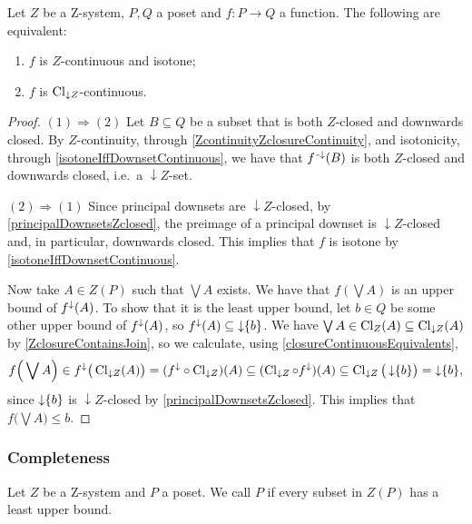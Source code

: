 \begin{proposition} \label{isotoneZcontinuousFunction}
Let $Z$ be a $\mathrm{Z}$-system, $P,Q$ a poset and $f: P\to Q$ a function. The following are equivalent:
\begin{enumerate}
\item $f$ is $Z$-continuous and isotone;
\item $f$ is $\operatorname{Cl}_{\downarrow Z}$-continuous.
\end{enumerate}
\end{proposition}
\begin{proof}
$(1) \Rightarrow (2)$ Let $B\subseteq Q$ be a subset that is both $Z$-closed and downwards closed. By $Z$-continuity, through \ref{ZcontinuityZclosureContinuity}, and isotonicity, through \ref{isotoneIffDownsetContinuous}, we have that $f^{\text{\hspace{0.15em}-}\downarrow}(B)$ is both $Z$-closed and downwards closed, i.e.\ a ${\downarrow Z}$-set.

$(2) \Rightarrow (1)$ Since principal downsets are ${\downarrow}Z$-closed, by \ref{principalDownsetsZclosed}, the preimage of a principal downset is ${\downarrow}Z$-closed and, in particular, downwards closed. This implies that $f$ is isotone by \ref{isotoneIffDownsetContinuous}.

Now take $A\in Z(P)$ such that $\bigvee A$ exists. We have that $f(\bigvee A)$ is an upper bound of $f^\downarrow(A)$. To show that it is the least upper bound, let $b\in Q$ be some other upper bound of $f^\downarrow(A)$, so $f^\downarrow(A) \subseteq \operatorname{\downarrow}\{b\}$.
We have $\bigvee A \in \operatorname{Cl}_Z(A) \subseteq \operatorname{Cl}_{\downarrow Z}(A)$ by \ref{ZclosureContainsJoin}, so we calculate, using \ref{closureContinuousEquivalents},
\[ f\Big(\bigvee A\Big) \in f^\downarrow\big(\operatorname{Cl}_{\downarrow Z}(A)\big) = (f^\downarrow\circ \operatorname{Cl}_{\downarrow Z})(A) \subseteq (\operatorname{Cl}_{\downarrow Z}\circ f^\downarrow)(A)\subseteq \operatorname{Cl}_{\downarrow Z}\big(\operatorname{\downarrow}\{b\}\big) = \operatorname{\downarrow}\{b\}, \]
since $\operatorname{\downarrow}\{b\}$ is ${\downarrow} Z$-closed by \ref{principalDownsetsZclosed}. This implies that $f\big(\bigvee A\big) \leq b$.
\end{proof}

\subsubsection{Completeness}
\begin{definition}
Let $Z$ be a $\mathrm{Z}$-system and $P$ a poset. We call $P$  if every subset in $Z(P)$ has a least upper bound.
\end{definition}

